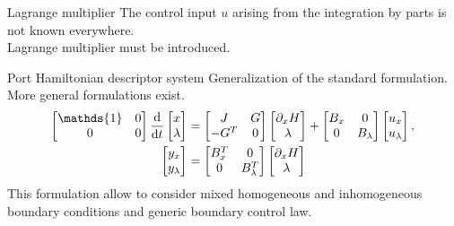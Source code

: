 \documentclass[aspectratio=169]{ISAE-Beamer}
\begin{document}
\begin{frame}[t]{Lagrange multiplier}
The control input $u$ arising from the integration by parts is not known everywhere.\\
Lagrange multiplier must be introduced.

\begin{block}{Port Hamiltonian descriptor system}
	Generalization of the standard formulation. More general formulations exist. 
\begin{align*}
\begin{bmatrix}
\mathds{1} & 0 \\
0 & 0 \\
\end{bmatrix}\diff{}{t}
\begin{bmatrix}
x \\ \lambda\\
\end{bmatrix} &= 
\begin{bmatrix}
J & G \\
-G^T & 0 \\
\end{bmatrix}
\begin{bmatrix}
\partial_{x} H \\ \lambda \\
\end{bmatrix}
+ \begin{bmatrix}
B_x & 0 \\ 0 & B_\lambda \\
\end{bmatrix} \begin{bmatrix}
u_x \\ u_\lambda\\
\end{bmatrix}, \\
\begin{bmatrix}
y_x \\ y_\lambda\\
\end{bmatrix} &= \begin{bmatrix}
B_x^T & 0 \\ 0 & B_\lambda^T \\
\end{bmatrix} \begin{bmatrix}
\partial_{x} H \\ \lambda\\
\end{bmatrix}
\end{align*}
This formulation allow to consider mixed homogeneous and inhomogeneous boundary conditions and generic boundary control law.
\end{block}
\end{frame}
\end{document}
